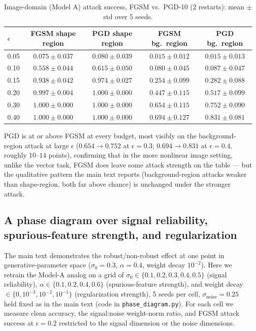 \documentclass[11pt]{article}
\begin{document}
\begin{table}[h]
\centering
\caption{Image-domain (Model A) attack success, FGSM vs.\ PGD-10 (2
restarts): mean $\pm$ std over 5 seeds.}
\label{tab:pgdimage}
\begin{tabular}{lcccc}
\toprule
$\epsilon$ & FGSM shape region & PGD shape region & FGSM bg.\ region & PGD bg.\ region \\
\midrule
0.05 & $0.075\pm0.037$ & $0.080\pm0.039$ & $0.015\pm0.012$ & $0.015\pm0.013$ \\
0.10 & $0.558\pm0.044$ & $0.615\pm0.050$ & $0.080\pm0.045$ & $0.087\pm0.047$ \\
0.15 & $0.938\pm0.042$ & $0.974\pm0.027$ & $0.254\pm0.099$ & $0.282\pm0.088$ \\
0.20 & $0.997\pm0.004$ & $1.000\pm0.000$ & $0.447\pm0.115$ & $0.517\pm0.099$ \\
0.30 & $1.000\pm0.000$ & $1.000\pm0.000$ & $0.654\pm0.115$ & $0.752\pm0.090$ \\
0.40 & $1.000\pm0.000$ & $1.000\pm0.000$ & $0.694\pm0.127$ & $0.831\pm0.081$ \\
\bottomrule
\end{tabular}
\end{table}

PGD is at or above FGSM at every budget, most visibly on the
background-region attack at large $\epsilon$ ($0.654 \to 0.752$ at
$\epsilon=0.3$; $0.694 \to 0.831$ at $\epsilon=0.4$, roughly $10$--$14$
points), confirming that in the more nonlinear image setting, unlike the
vector task, FGSM does leave some attack strength on the table --- but
the qualitative pattern the main text reports (background-region attacks
weaker than shape-region, both far above chance) is unchanged under the
stronger attack.

\subsection{A phase diagram over signal reliability, spurious-feature
strength, and regularization}
\label{app:phase}

The main text demonstrates the robust/non-robust effect at one point in
generative-parameter space ($\sigma_0=0.3$, $\alpha=0.4$, weight decay
$10^{-2}$). Here we retrain the Model-A analog on a grid of $\sigma_0 \in
\{0.1,0.2,0.3,0.4,0.5\}$ (signal reliability), $\alpha \in
\{0.1,0.2,0.4,0.6\}$ (spurious-feature strength), and weight decay $\in
\{0, 10^{-3}, 10^{-2}, 10^{-1}\}$ (regularization strength), 5 seeds per
cell, $\sigma_{\mathrm{noise}}=0.25$ held fixed as in the main text (code
in \texttt{phase\_diagram.py}). For each cell we measure clean accuracy,
the signal:noise weight-norm ratio, and FGSM attack success at
$\epsilon=0.2$ restricted to the signal dimension or the noise dimensions.
\end{document}

